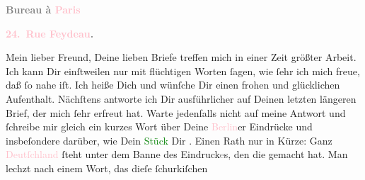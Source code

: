            \begin{otherlanguage}{french}\textcolor{gray}{\textbf{\textbf{Bureau à \textcolor{pink}{Paris}{}\ledrightnote{\textcolor{pink}{Paris}}}}}\end{otherlanguage}\pend
           \pstart
           \begin{otherlanguage}{french}\textcolor{gray}{\textbf{\textbf{\textcolor{pink}{24. Rue Feydeau}{}\ledrightnote{\textcolor{pink}{rue Feydeau}}.}}}\end{otherlanguage}\pend
           \pstart{}Mein lieber Freund,\pend\pstart
           Deine lieben Briefe treffen mich in einer Zeit größter Arbeit. Ich kann Dir
               einſtweilen nur mit flüchtigen Worten ſagen, wie ſehr ich mich freue, daß \label{K_L02788-1v}\label{K_L02788-1h} ſo nahe iſt. Ich heiße Dich \label{K_L02788-2v}\label{K_L02788-2h} und wünſche Dir einen
               frohen und glücklichen Aufenthalt. Nächſtens antworte ich Dir ausführlicher auf
               Deinen letzten längeren Brief, der mich ſehr erfreut hat. {\pb}Warte jedenfalls nicht auf meine Antwort und
               ſchreibe mir gleich ein kurzes Wort über Deine \textcolor{pink}{Berlin}{}\ledrightnote{\textcolor{pink}{Berlin}}er \strikeout{\textcolor{gray}{A}} Eindrücke und insbeſondere  darüber, wie
               Dein \textcolor{green}{Stück}{} Dir \label{K_L02788-3v}\label{K_L02788-3h}.
               Einen Rath nur in Kürze: Ganz \textcolor{pink}{Deutſchland}{}\ledrightnote{\textcolor{pink}{Deutschland}} ſteht
               unter dem Banne des Eindruck\textcolor{gray}{e}s, den die \label{K_L02788-4v}\label{K_L02788-4h} gemacht hat. Man lechzt nach einem Wort, das dieſe ſchurkiſchen
